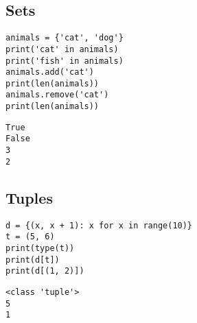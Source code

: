 \subsection{Sets}
\vspace{-.75cm}
\begin{code}
\begin{lstlisting}
animals = {'cat', 'dog'}
print('cat' in animals)
print('fish' in animals)
animals.add('cat')
print(len(animals))       
animals.remove('cat')
print(len(animals))
\end{lstlisting}
\end{code}
\vspace{-1cm}
\begin{verbatim}
True
False
3
2
\end{verbatim}
\vspace{-.75cm}
\subsection{Tuples}
\vspace{-.75cm}
\begin{code}
\begin{lstlisting}
d = {(x, x + 1): x for x in range(10)}
t = (5, 6)
print(type(t))
print(d[t])       
print(d[(1, 2)])
\end{lstlisting}
\end{code}
\vspace{-.95cm}
\begin{verbatim}
<class 'tuple'>
5
1
\end{verbatim}
\vspace{-.95cm}
